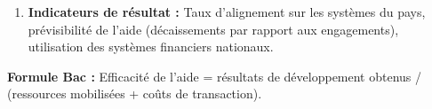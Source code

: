 \documentclass[11pt]{article}
\newcommand{\cle}[1]{{\popxbold\color{popdark}#1}}
\begin{document}
\begin{methode}
\begin{enumerate}
\begin{itemize}
                \item \textbf{Conditionnalités :} \cle{Conditionnalités politiques} (gouvernance, droits de l'homme, lutte contre la corruption — FMI, UE, USA) contre \cle{non-conditionnalité politique} (Chine, certains pays arabes).
            \end{itemize}
        \item \textbf{Indicateurs de résultat :} Taux d'alignement sur les systèmes du pays, prévisibilité de l'aide (décaissements par rapport aux engagements), utilisation des systèmes financiers nationaux.
    \end{enumerate}
    \textbf{Formule Bac :} \cle{Efficacité de l'aide} = résultats de développement obtenus / (ressources mobilisées + coûts de transaction).
\end{methode}
\end{document}
